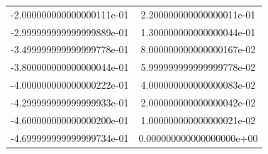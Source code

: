 \begin{table}
\begin{tabular}{S[round-precision = 1]|S[round-precision = 1]}
      -2.000000000000000111e-01 & 2.200000000000000011e-01\\
      -2.999999999999999889e-01 & 1.300000000000000044e-01\\
      -3.499999999999999778e-01 & 8.000000000000000167e-02\\
      -3.800000000000000044e-01 & 5.999999999999999778e-02\\
      -4.000000000000000222e-01 & 4.000000000000000083e-02\\
      -4.299999999999999933e-01 & 2.000000000000000042e-02\\
      -4.600000000000000200e-01 & 1.000000000000000021e-02\\
      -4.699999999999999734e-01 & 0.000000000000000000e+00\\
      \bottomrule
    \end{tabular}
\end{table}

